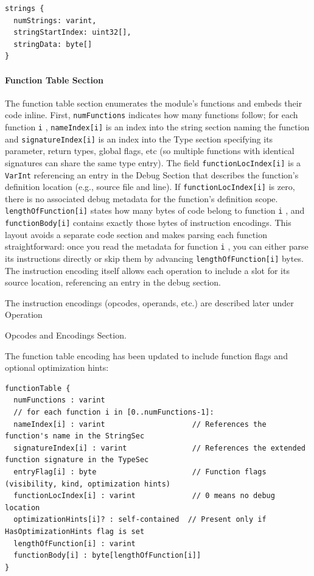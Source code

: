 \documentclass{article}
\begin{document}
\begin{lstlisting}
strings {
  numStrings: varint,
  stringStartIndex: uint32[],
  stringData: byte[]
}
\end{lstlisting}


\paragraph{Function Table Section}

The function table section enumerates the module's functions and embeds their code inline. First, \texttt{numFunctions} indicates how many functions follow; for each function \texttt{i} , \texttt{nameIndex[i]} is an index into the string section naming the function and \texttt{signatureIndex[i]} is an index into the Type section specifying its parameter, return types, global flags, etc (so multiple functions with identical signatures can share the same type entry). The field \texttt{functionLocIndex[i]} is a \texttt{VarInt} referencing an entry in the Debug Section that describes the function's definition location (e.g., source file and line). If \texttt{functionLocIndex[i]} is zero, there is no associated debug metadata for the function's definition scope. \texttt{lengthOfFunction[i]} states how many bytes of code belong to function \texttt{i} , and \texttt{functionBody[i]} contains exactly those bytes of instruction encodings. This layout avoids a separate code section and makes parsing each function straightforward: once you read the metadata for function \texttt{i} , you can either parse its instructions directly or skip them by advancing \texttt{lengthOfFunction[i]} bytes. The instruction encoding itself allows each operation to include a slot for its source location, referencing an entry in the debug section.


The instruction encodings (opcodes, operands, etc.) are described later under Operation

Opcodes and Encodings Section.


The function table encoding has been updated to include function flags and optional optimization hints:


\begin{lstlisting}
functionTable {
  numFunctions : varint
  // for each function i in [0..numFunctions-1]:
  nameIndex[i] : varint                    // References the function's name in the StringSec
  signatureIndex[i] : varint               // References the extended function signature in the TypeSec
  entryFlag[i] : byte                      // Function flags (visibility, kind, optimization hints)
  functionLocIndex[i] : varint             // 0 means no debug location
  optimizationHints[i]? : self-contained  // Present only if HasOptimizationHints flag is set
  lengthOfFunction[i] : varint
  functionBody[i] : byte[lengthOfFunction[i]]
}
\end{lstlisting}
\end{document}
